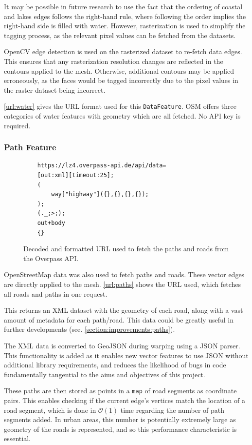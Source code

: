 \documentclass[12pt]{article}
\begin{document}
It may be possible in future research to use the fact that the ordering of coastal and lakes edges follows the right-hand rule, where following the order implies the right-hand side is filled with water. However, rasterization is used to simplify the tagging process, as the relevant pixel values can be fetched from the datasets.

OpenCV edge detection is used on the rasterized dataset to re-fetch data edges. This ensures that any rasterization resolution changes are reflected in the contours applied to the mesh. Otherwise, additional contours may be applied erroneously, as the faces would be tagged incorrectly due to the pixel values in the raster dataset being incorrect.

\autoref{url:water} gives the URL format used for this \texttt{DataFeature}. OSM offers three categories of water features with geometry which are all fetched. No API key is required.

\subsubsection{Path Feature}

\begin{figure}[H]
  \centering
  \begin{lstlisting}
	https://lz4.overpass-api.de/api/data=
	[out:xml][timeout:25];
	(
		way["highway"]({},{},{},{});
	);
	(._;>;);
	out+body
	{}
	\end{lstlisting}
  \caption{Decoded and formatted URL used to fetch the paths and roads from the Overpass API.}
  \label{url:paths}
\end{figure}

OpenStreetMap data was also used to fetch paths and roads. These vector edges are directly applied to the mesh. \autoref{url:paths} shows the URL used, which fetches all roads and paths in one request.

This returns an XML dataset with the geometry of each road, along with a vast amount of metadata for each path/road. This data could be greatly useful in further developments (see. \autoref{section:improvements:paths}).

The XML data is converted to GeoJSON during warping using a JSON parser. This functionality is added as it enables new vector features to use JSON without additional library requirements, and reduces the likelihood of bugs in code fundamentally tangential to the aims and objectives of this project.

These paths are then stored as points in a \texttt{map} of road segments as coordinate pairs. This enables checking if the current edge's vertices match the location of a road segment, which is done in $\mathcal{O} (1)$ time regarding the number of path segments added. In urban areas, this number is potentially extremely large as geometry of the roads is represented, and so this performance characteristic is essential.
\end{document}
